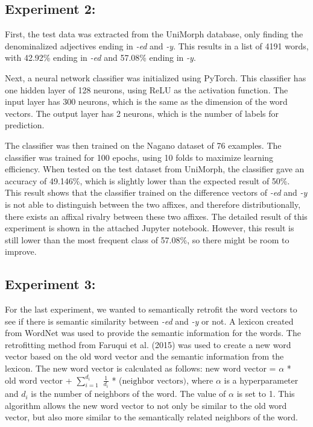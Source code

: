 \documentclass[12pt]{article}
\begin{document}
    \subsection{Experiment 2:}
    First, the test data was extracted from the UniMorph database, only finding the denominalized adjectives ending in \emph{-ed} and \emph{-y}. This results in a list of 4191 words, with 42.92\% ending in \emph{-ed} and 57.08\% ending in \emph{-y}. 

    Next, a neural network classifier was initialized using PyTorch. This classifier has one hidden layer of 128 neurons, using ReLU as the activation function. The input layer has 300 neurons, which is the same as the dimension of the word vectors. The output layer has 2 neurons, which is the number of labels for prediction.  
    
    The classifier was then trained on the Nagano dataset of 76 examples. The classifier was trained for 100 epochs, using 10 folds to maximize learning efficiency. When tested on the test dataset from UniMorph, the classifier gave an accuracy of 49.146\%, which is slightly lower than the expected result of 50\%. This result shows that the classifier trained on the difference vectors of \emph{-ed} and \emph{-y} is not able to distinguish between the two affixes, and therefore distributionally, there exists an affixal rivalry between these two affixes. The detailed result of this experiment is shown in the attached Jupyter notebook. However, this result is still lower than the most frequent class of 57.08\%, so there might be room to improve. 

    \subsection{Experiment 3:}
    For the last experiment, we wanted to semantically retrofit the word vectors to see if there is semantic similarity between \emph{-ed} and \emph{-y} or not. A lexicon created from WordNet was used to provide the semantic information for the words. The retrofitting method from Faruqui et al. (2015) was used to create a new word vector based on the old word vector and the semantic information from the lexicon. The new word vector is calculated as follows: $\text{new word vector}$ = $\alpha$ * $\text{old word vector}$ + $\sum_{i=1}^{d_i}$ $\frac{1}{d_i}$ * ($\text{neighbor vectors})$, where $\alpha$ is a hyperparameter and $d_i$ is the number of neighbors of the word. The value of $\alpha$ is set to 1. This algorithm allows the new word vector to not only be similar to the old word vector, but also more similar to the semantically related neighbors of the word.
\end{document}
